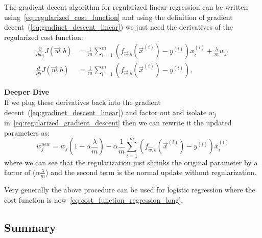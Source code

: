 \documentclass[11pt,letterpaper]{article}
\begin{document}
\begin{notebox}
	The gradient decent algorithm for regularized linear regression can be written using~\cref{eq:regularized_cost_function} and using the definition of gradient decent~(\cref{eq:gradinet_descent_linear}) we just need the derivatives of the regularized cost function:
	\begin{align}
		\frac{\partial}{\partial w_j} J(\vec{w},b) &= \frac{1}{m} \sum \limits^{m}_{i=1} \left(
f_{\vec{w},b}( \vec{x}^{(i)} )  - y^{(i)}\right) x_i^{(i)} +\frac{\lambda}{m}w_j,
	\label{eq:regularized_gradient_descent} 
	\\ 
		\frac{\partial}{\partial b} J(\vec{w},b) &= \frac{1}{m} \sum \limits^{m}_{i=1} \left(
f_{\vec{w},b} (\vec{x}^{(i)} ) - y^{(i)} \right), 	
	\end{align}
	
	\textbf{Deeper Dive}\\
	If we plug these derivatives back into the gradient decent~(\cref{eq:gradinet_descent_linear}) and factor out and isolate $w_j$ in~\cref{eq:regularized_gradient_descent} then we can rewrite it the updated parameters as:
	\begin{equation}
		w_j^{new} = w_j \left( 1-\alpha\frac{\lambda}{m} \right) -\alpha \frac{1}{m} \sum \limits^{m}_{i=1} \left(f_{\vec{w},b}( \vec{x}^{(i)} )  - y^{(i)}\right) x_i^{(i)}
	\end{equation}
	where we can see that the regularization just shrinks the original parameter by a factor of ($\alpha\frac{\lambda}{m}$) and the second term is the normal update without regularization.
	
	Very generally the above procedure can be used for logistic regression where the cost function is now~\cref{eq:cost_function_regression_long}.
\end{notebox}

\subsection{Summary}
\end{document}

